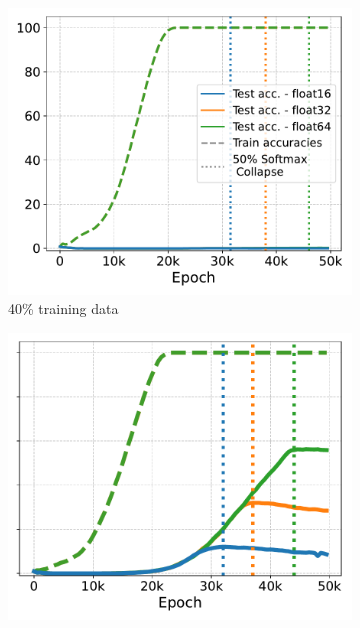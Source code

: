 \begin{figure}[t]
\centering
\begin{subfigure}{.32\textwidth}
  \centering
  \includegraphics[width=\linewidth]{grokking_iclr_arxiv/figures/float32vsfloat64_40_percent_lr_sch.pdf}
  \caption{40\% training data}
  \label{fig:grokking_stops_40_lr_sch}
\end{subfigure}
\hfill
\begin{subfigure}{.32\textwidth}
  \centering
  \includegraphics[width=\linewidth]{grokking_iclr_arxiv/figures/float32vsfloat64_60_percent_lr_sch.pdf}

\end{subfigure}
\end{figure}
